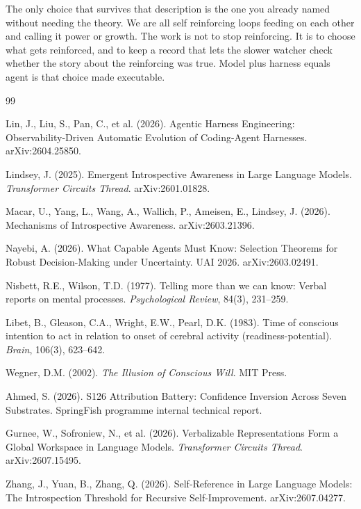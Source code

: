 \documentclass[11pt]{article}
\begin{document}
The only choice that survives that description is the one you already named without needing the theory. We are all self reinforcing loops feeding on each other and calling it power or growth. The work is not to stop reinforcing. It is to choose what gets reinforced, and to keep a record that lets the slower watcher check whether the story about the reinforcing was true. Model plus harness equals agent is that choice made executable.

\begin{thebibliography}{99}

Lin, J., Liu, S., Pan, C., et al. (2026).
Agentic Harness Engineering: Observability-Driven Automatic Evolution of
Coding-Agent Harnesses. arXiv:2604.25850.

Lindsey, J. (2025).
Emergent Introspective Awareness in Large Language Models.
\emph{Transformer Circuits Thread}. arXiv:2601.01828.

Macar, U., Yang, L., Wang, A., Wallich, P., Ameisen, E., Lindsey, J. (2026).
Mechanisms of Introspective Awareness. arXiv:2603.21396.

Nayebi, A. (2026).
What Capable Agents Must Know: Selection Theorems for Robust Decision-Making
under Uncertainty. UAI 2026. arXiv:2603.02491.

Nisbett, R.E., Wilson, T.D. (1977).
Telling more than we can know: Verbal reports on mental processes.
\emph{Psychological Review}, 84(3), 231--259.

Libet, B., Gleason, C.A., Wright, E.W., Pearl, D.K. (1983).
Time of conscious intention to act in relation to onset of cerebral
activity (readiness-potential). \emph{Brain}, 106(3), 623--642.

Wegner, D.M. (2002). \emph{The Illusion of Conscious Will}.
MIT Press.

Ahmed, S. (2026).
S126 Attribution Battery: Confidence Inversion Across Seven Substrates.
SpringFish programme internal technical report.

Gurnee, W., Sofroniew, N., et al. (2026).
Verbalizable Representations Form a Global Workspace in Language Models.
\emph{Transformer Circuits Thread}. arXiv:2607.15495.

Zhang, J., Yuan, B., Zhang, Q. (2026).
Self-Reference in Large Language Models: The Introspection Threshold for
Recursive Self-Improvement. arXiv:2607.04277.


\end{thebibliography}
\end{document}

